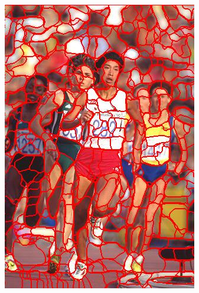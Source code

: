 \begin{figure}
{		\includegraphics[scale=\scalefivebsdtest]{pictures/bsd-test-8-nc}
	}
	\subfigure{
}
\end{figure}

